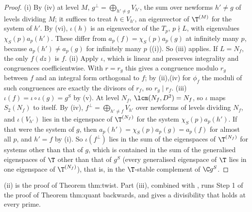 \begin{proof}
(i) By (iv) at level $M$, $g^\perp=\bigoplus_{h'\ne g}V_{h'}$, the sum over newforms $h'\ne g$ of levels dividing $M$; it suffices to treat $h\in V_{h'}$, an eigenvector of
$\T^{(M)}$ for the system of $h'$. By (vi), $\iota(h)$ is an eigenvector of the $T_p$, $p\nmid L$, with eigenvalues $\chi_S(p)a_p(h')$. These differ from
$a_p(f)=\chi_S(p)a_p(g)$ at infinitely many $p$, because $a_p(h')\ne a_p(g)$ for infinitely many $p$ ((i)). So (iii) applies. If
$L=N_f$, the only $f(dz)$ is $f$. (ii) Apply $\iota$, which is linear and preserves integrality and congruences coefficientwise. With $r=r_g$ this gives a congruence modulo $r_g$ between $f$ and an integral form
orthogonal to $f$; by (ii),(iv) for $\phi_f$ the moduli of such congruences are exactly the divisors of $r_f$, so $r_g\mid r_f$. (iii) $\iota(f)=\iota\circ\iota(g)=g^S$ by
(v). At level $N_f$, $\lcm(N_f,D^2)=N_f$, so $\iota$ maps $S_2(N_f)$ to itself. By (iv), $f^\perp=\bigoplus_{h'\ne f}V_{h'}$ over newforms of
levels dividing $N_f$, and $\iota(V_{h'})$ lies in the eigenspace of $\T^{(N_f)}$ for the system $\chi_S(p)a_p(h')$. If that were the system of $g$, then $a_p(h')=\chi_S(p)a_p(g)=a_p(f)$ for almost all $p$,
and $h'=f$ by (i). So $\iota(f^\perp)$ lies in the sum of the eigenspaces of $\T^{(N_f)}$ for systems other than that of $g$, which is contained in the sum of
the generalised eigenspaces of $\T$ other than that of $g^S$ (every generalised eigenspace of $\T$ lies in one eigenspace of $\T^{(N_f)}$), that is, in the $\T$-stable complement of $\C g^S$.
\end{proof}

(ii) is the proof of Theorem thm:twist. Part (iii), combined with , runs Step 1 of the proof of Theorem
thm:quant backwards, and gives a divisibility that holds at every prime.

